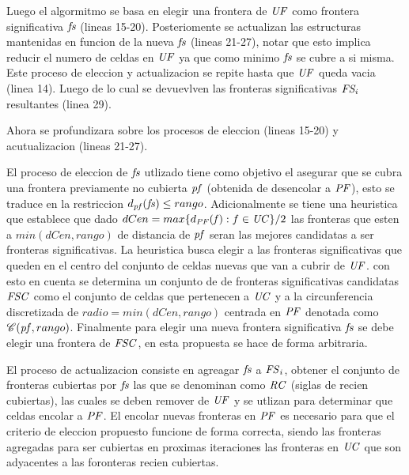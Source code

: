 Luego el algormitmo se basa en elegir una frontera de $\mathit{UF}$ como frontera
significativa $\mathit{fs}$ (lineas 15-20). Posteriomente se actualizan las
estructuras mantenidas en funcion de la nueva $\mathit{fs}$ (lineas 21-27), notar
que esto implica reducir el numero de celdas en $\mathit{UF}$ ya que como minimo
$\mathit{fs}$ se cubre a si misma. Este proceso de eleccion y actualizacion se
repite hasta que $\mathit{UF}$ queda vacia (linea 14). Luego de lo cual se
devuevlven las fronteras significativas $\mathit{FS_i}$ resultantes (linea 29).
 
Ahora se profundizara sobre los procesos de eleccion (lineas 15-20) y
acutualizacion (lineas 21-27).

El proceso de eleccion de $\mathit{fs}$ utlizado tiene como objetivo el asegurar
que se cubra una frontera previamente no cubierta $\mathit{pf}$ (obtenida de
desencolar a $\mathit{PF}$), esto se traduce en la restriccion
$d_{\mathit{pf}}(\mathit{fs}) \leq rango$. Adicionalmente se tiene una heuristica que
establece que dado $dCen = max\{ d_{\mathit{PF}}(\mathit{f}) : f\in\mathit{UC} \}/2$ las
fronteras que esten a $min(dCen,rango)$ de distancia de $\mathit{pf}$ seran las
mejores candidatas a ser fronteras significativas. La heuristica busca elegir a
las fronteras significativas que queden en el centro del conjunto de celdas
nuevas que van a cubrir de $\mathit{UF}$. con esto en cuenta se determina un
conjunto de de fronteras significativas candidatas $\mathit{FSC}$ como el conjunto
de celdas que pertenecen a $\mathit{UC}$ y a la circunferencia discretizada
de $radio = min(dCen,rango)$ centrada en $\mathit{PF}$ denotada como
$\mathscr{C}(\mathit{pf},rango)$. Finalmente para elegir una nueva frontera
significativa $\mathit{fs}$ se debe elegir una frontera de $\mathit{FSC}$, en esta
propuesta se hace de forma arbitraria.

El proceso de actualizacion consiste en agreagar $\mathit{fs}$ a $\mathit{FS}_i$, obtener el
conjunto de fronteras cubiertas por $\mathit{fs}$ las que se denominan como
$\mathit{RC}$ (siglas de recien cubiertas), las cuales se deben remover de
$\mathit{UF}$ y se utlizan para determinar que celdas encolar a $\mathit{PF}$.
El encolar nuevas fronteras en $\mathit{PF}$ es necesario para que el criterio de
eleccion propuesto funcione de forma correcta, siendo las fronteras agregadas
para ser cubiertas en proximas iteraciones las fronteras en $\mathit{UC}$ que son
adyacentes a las foronteras recien cubiertas.

